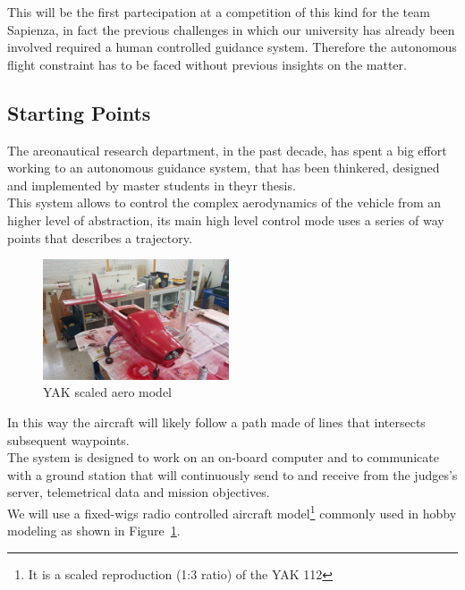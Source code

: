 \documentclass[oneside,onecolumn]{article}
\begin{document}
This will be the first partecipation at a competition of this kind for the team
Sapienza, in fact the previous challenges in which our university has already
been involved required a human controlled guidance system.
Therefore the autonomous flight constraint has to be faced without previous
insights on the matter.
\newpage

\subsection{Starting Points}
The areonautical research department, in the past decade, has spent a big
effort working to an autonomous guidance system, that has been thinkered,
designed and implemented by master students in theyr thesis.\\
This system allows to control the complex aerodynamics of the vehicle from an
higher level of abstraction, its main high level control mode uses a series of
way points that describes a trajectory.\\
\bigskip
\begin{figure}
  \caption{YAK scaled aero model}\label{wrap-fig:1}
  \includegraphics[width=5.5cm]{YAK1}
\end{figure} 

In this way the aircraft will likely follow a path made of lines that intersects subsequent waypoints.\\
The system is designed to work on an on-board computer and to communicate with a
ground station that will continuously send to and receive from the judges's
server, telemetrical data and mission objectives.\\
We will use a fixed-wigs radio controlled aircraft model\footnote{It is a scaled
  reproduction (1:3 ratio) of the YAK 112} commonly used in hobby
modeling as shown in Figure~\ref{wrap-fig:1}.
\end{document}
